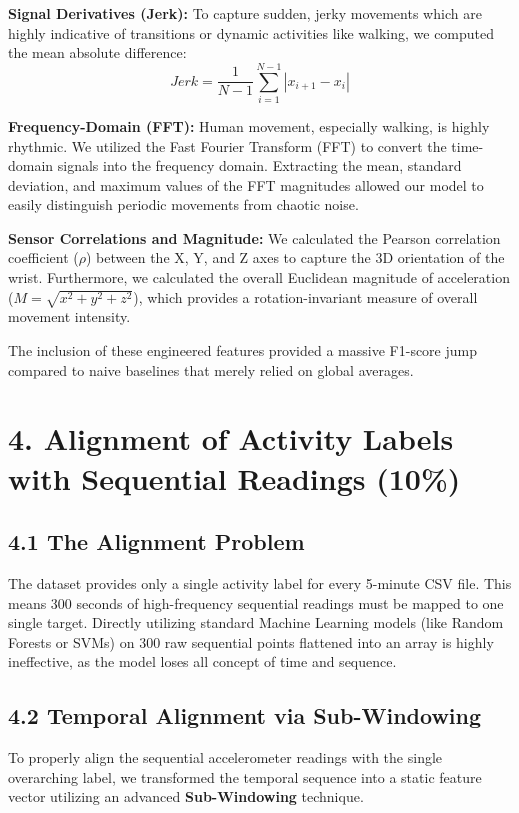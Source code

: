 \documentclass[12pt, a4paper]{article}
\begin{document}
\textbf{Signal Derivatives (Jerk):} To capture sudden, jerky movements which are highly indicative of transitions or dynamic activities like walking, we computed the mean absolute difference:
\begin{equation}
    Jerk = \frac{1}{N-1} \sum_{i=1}^{N-1} |x_{i+1} - x_i|
\end{equation}

\textbf{Frequency-Domain (FFT):} Human movement, especially walking, is highly rhythmic. We utilized the Fast Fourier Transform (FFT) to convert the time-domain signals into the frequency domain. Extracting the mean, standard deviation, and maximum values of the FFT magnitudes allowed our model to easily distinguish periodic movements from chaotic noise.

\textbf{Sensor Correlations and Magnitude:} We calculated the Pearson correlation coefficient ($\rho$) between the X, Y, and Z axes to capture the 3D orientation of the wrist. Furthermore, we calculated the overall Euclidean magnitude of acceleration ($M = \sqrt{x^2 + y^2 + z^2}$), which provides a rotation-invariant measure of overall movement intensity.

The inclusion of these engineered features provided a massive F1-score jump compared to naive baselines that merely relied on global averages.

\section*{4. Alignment of Activity Labels with Sequential Readings (10\%)}

\subsection*{4.1 The Alignment Problem}
The dataset provides only a single activity label for every 5-minute CSV file. This means 300 seconds of high-frequency sequential readings must be mapped to one single target. Directly utilizing standard Machine Learning models (like Random Forests or SVMs) on 300 raw sequential points flattened into an array is highly ineffective, as the model loses all concept of time and sequence.

\subsection*{4.2 Temporal Alignment via Sub-Windowing}
To properly align the sequential accelerometer readings with the single overarching label, we transformed the temporal sequence into a static feature vector utilizing an advanced \textbf{Sub-Windowing} technique.
\end{document}
